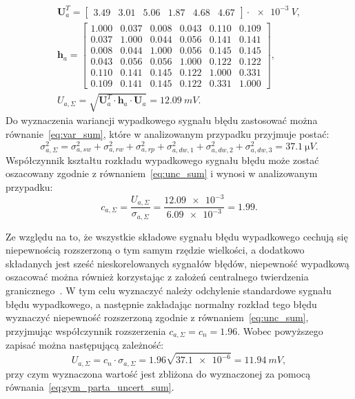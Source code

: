 \begin{gather}
\mathbf{U}_{a}^{T} =
\begin{bmatrix}
3.49 & 3.01 & 5.06 & 1.87 & 4.68 & 4.67
\end{bmatrix} \cdot \qty{e-3}{V}
\label{eq:sym_parta_uncert_vector_val}, \\
\mathbf{h}_{a} =
\begin{bmatrix}
1.000 & 0.037 & 0.008 & 0.043 & 0.110 & 0.109 \\
0.037 & 1.000 & 0.044 & 0.056 & 0.141 & 0.141 \\
0.008 & 0.044 & 1.000 & 0.056 & 0.145 & 0.145 \\
0.043 & 0.056 & 0.056 & 1.000 & 0.122 & 0.122 \\
0.110 & 0.141 & 0.145 & 0.122 & 1.000 & 0.331 \\
0.109 & 0.141 & 0.145 & 0.122 & 0.331 & 1.000
\end{bmatrix}
\label{eq:sym_parta_uncert_coher_val}, \\
U_{a,\Sigma} = \sqrt{\mathbf{U}_{a}^{T} \cdot \mathbf{h}_{a} \cdot \mathbf{U}_{a}} = \qty{12.09}{mV} \label{eq:sym_parta_uncert_value_a}.
\end{gather}
Do wyznaczenia wariancji wypadkowego sygnału błędu zastosować można równanie~\eqref{eq:var_sum}, które w analizowanym przypadku przyjmuje postać:
\begin{equation}
\sigma_{a,\Sigma}^{2} = \sigma_{a,sw}^{2} + \sigma_{a,rw}^{2} + \sigma_{a,rp}^{2} + \sigma_{a,dw,1}^{2} + \sigma_{a,dw,2}^{2} + \sigma_{a,dw,3}^{2} = \qty{37.1}{\micro V} \label{eq:sym_parta_var_sum}.
\end{equation}
Współczynnik kształtu rozkładu wypadkowego sygnału błędu może zostać oszacowany zgodnie z równaniem~\eqref{eq:unc_sum} i wynosi w analizowanym przypadku:
\begin{equation}
c_{a,\Sigma} = \frac{U_{a,\Sigma}}{\sigma_{a,\Sigma}} = \frac{\num{12.09e-3}}{\num{6.09e-3}} = 1.99 \label{eq:sym_parta_uncert_factor}.
\end{equation}

Ze względu na to, że wszystkie składowe sygnału błędu wypadkowego cechują się niepewnością rozszerzoną o tym samym rzędzie wielkości, a dodatkowo składanych jest sześć nieskorelowanych sygnałów błędów, niepewność wypadkową oszacować można również korzystając z założeń centralnego twierdzenia granicznego~\cite{jcgm_guide}. W tym celu wyznaczyć należy odchylenie standardowe sygnału błędu wypadkowego, a następnie zakładając normalny rozkład tego błędu wyznaczyć niepewność rozszerzoną zgodnie z równaniem~\eqref{eq:unc_sum}, przyjmując współczynnik rozszerzenia $c_{a,\Sigma} = c_{n} = 1.96$. Wobec powyższego zapisać można następującą zależność:
\begin{equation}
U_{a,\Sigma} = c_{n} \cdot \sigma_{a,\Sigma} = 1.96 \sqrt{\num{37.1e-6}} = \qty{11.94}{mV} \label{eq:sym_parta_uncert_value_b},
\end{equation}
przy czym wyznaczona wartość jest zbliżona do wyznaczonej za pomocą równania~\eqref{eq:sym_parta_uncert_sum}.

